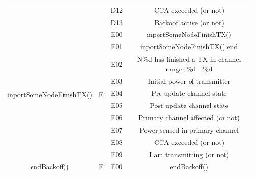 \documentclass[a4paper]{article}
\begin{document}
\begin{table}[h!]
\begin{tabular}{|c|c|c|c|}
		                                           &                     & D12               & CCA exceeded (or not)                                   \\ \cline{3-4} 
		                                           &                     & D13               & Backoof active (or not)                                 \\ \hline
		\multirow{10}{*}{inportSomeNodeFinishTX()} & \multirow{10}{*}{E} & E00               & inportSomeNodeFinishTX()                                \\ \cline{3-4} 
		                                           &                     & E01               & inportSomeNodeFinishTX() end                            \\ \cline{3-4} 
		                                           &                     & E02               & N\%d has finished a TX in channel range: \%d - \%d      \\ \cline{3-4} 
		                                           &                     & E03               & Initial power of transmitter                            \\ \cline{3-4} 
		                                           &                     & E04               & Pre update channel state                                \\ \cline{3-4} 
		                                           &                     & E05               & Post update channel state                               \\ \cline{3-4} 
		                                           &                     & E06               & Primary channel affected (or not)                       \\ \cline{3-4} 
		                                           &                     & E07               & Power sensed in primary channel                         \\ \cline{3-4} 
		                                           &                     & E08               & CCA exceeded (or not)                                   \\ \cline{3-4} 
		                                           &                     & E09               & I am transmitting (or not)                              \\ \hline
		\multirow{6}{*}{endBackoff()}              & \multirow{6}{*}{F}  & F00               & endBackoff()                                            \\ \cline{3-4} 

\end{tabular}
\end{table}
\end{document}
